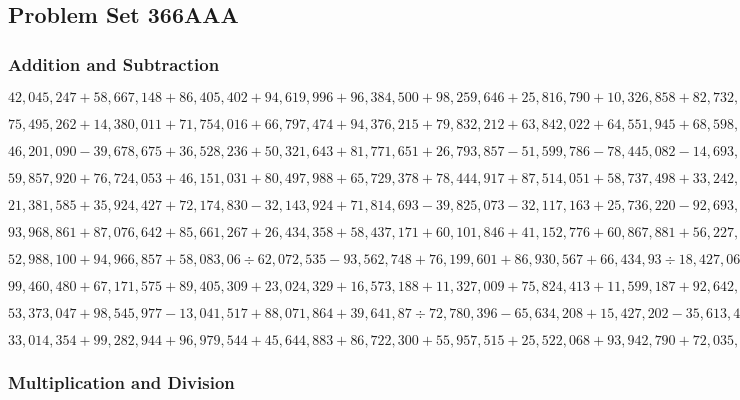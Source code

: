 \hypertarget{problem-set-366aaa}{%
\subsection{Problem Set 366AAA}\label{problem-set-366aaa}}

\hypertarget{addition-and-subtraction}{%
\subsubsection{Addition and
Subtraction}\label{addition-and-subtraction}}

\(42,045,247+58,667,148+86,405,402+94,619,996+96,384,500+98,259,646+25,816,790+10,326,858+82,732,994+57,997,765\)

\(75,495,262+14,380,011+71,754,016+66,797,474+94,376,215+79,832,212+63,842,022+64,551,945+68,598,044+34,868,907\)

\(46,201,090-39,678,675+36,528,236+50,321,643+81,771,651+26,793,857-51,599,786-78,445,082-14,693,733+21,330,882\)

\(59,857,920+76,724,053+46,151,031+80,497,988+65,729,378+78,444,917+87,514,051+58,737,498+33,242,955+28,352,605\)

\(21,381,585+35,924,427+72,174,830-32,143,924+71,814,693-39,825,073-32,117,163+25,736,220-92,693,725+99,569,969\)

\(93,968,861+87,076,642+85,661,267+26,434,358+58,437,171+60,101,846+41,152,776+60,867,881+56,227,589+34,417,354\)

\(52,988,100+94,966,857+58,083,06÷62,072,535-93,562,748+76,199,601+86,930,567+66,434,93÷18,427,063-70,508,806\)

\(99,460,480+67,171,575+89,405,309+23,024,329+16,573,188+11,327,009+75,824,413+11,599,187+92,642,469+80,514,491\)

\(53,373,047+98,545,977-13,041,517+88,071,864+39,641,87÷72,780,396-65,634,208+15,427,202-35,613,480+93,488,089\)

\(33,014,354+99,282,944+96,979,544+45,644,883+86,722,300+55,957,515+25,522,068+93,942,790+72,035,909+87,704,023\)

\hypertarget{multiplication-and-division}{%
\subsubsection{Multiplication and
Division}\label{multiplication-and-division}}

